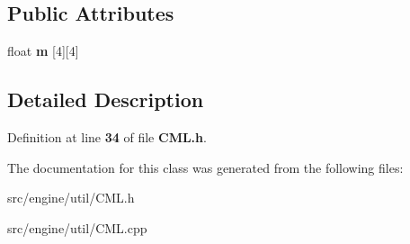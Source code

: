 \subsection*{Public Attributes}
\begin{DoxyCompactItemize}
\item 
\mbox{\label{class_c_m_l_1_1_matrix4f_aa46fce626967a77bebc91d8a8cc9f271}} 
float {\bfseries m} [4][4]
\end{DoxyCompactItemize}


\subsection{Detailed Description}


Definition at line \textbf{ 34} of file \textbf{ C\+M\+L.\+h}.



The documentation for this class was generated from the following files\+:\begin{DoxyCompactItemize}
\item 
src/engine/util/C\+M\+L.\+h\item 
src/engine/util/C\+M\+L.\+cpp\end{DoxyCompactItemize}
